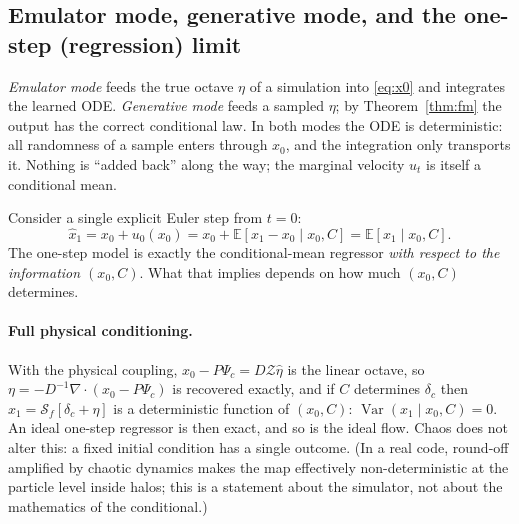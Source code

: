 \documentclass[11pt]{article}
\theoremstyle{definition}
\newcommand{\Psic}{\Psi_{c}}
\newcommand{\E}{\mathbb{E}}
\newcommand{\Var}{\operatorname{Var}}
\newcommand{\Zel}{\mathcal{Z}}
\newcommand{\Nbody}{\mathcal{S}}
\begin{document}
\subsection{Emulator mode, generative mode, and the one-step (regression) limit}

\emph{Emulator mode} feeds the true octave $\eta$ of a simulation into \eqref{eq:x0} and integrates the learned ODE. \emph{Generative mode} feeds a sampled $\eta$; by Theorem~\ref{thm:fm} the output has the correct conditional law. In both modes the ODE is deterministic: all randomness of a sample enters through $x_0$, and the integration only transports it. Nothing is ``added back'' along the way; the marginal velocity $u_t$ is itself a conditional mean.

Consider a single explicit Euler step from $t=0$:
\begin{equation}
\hat x_1=x_0+u_0(x_0)=x_0+\E[x_1-x_0\mid x_0,C]=\E[x_1\mid x_0,C].
\end{equation}
The one-step model is exactly the conditional-mean regressor \emph{with respect to the information $(x_0,C)$}. What that implies depends on how much $(x_0,C)$ determines.

\paragraph{Full physical conditioning.} With the physical coupling, $x_0-P\Psic=D\Zel\hat\eta$ is the linear octave, so $\eta=-D^{-1}\nabla\cdot(x_0-P\Psic)$ is recovered exactly, and if $C$ determines $\delta_c$ then $x_1=\Nbody_f[\delta_c+\eta]$ is a deterministic function of $(x_0,C)$: $\Var(x_1\mid x_0,C)=0$. An ideal one-step regressor is then exact, and so is the ideal flow. Chaos does not alter this: a fixed initial condition has a single outcome. (In a real code, round-off amplified by chaotic dynamics makes the map effectively non-deterministic at the particle level inside halos; this is a statement about the simulator, not about the mathematics of the conditional.)
\end{document}

